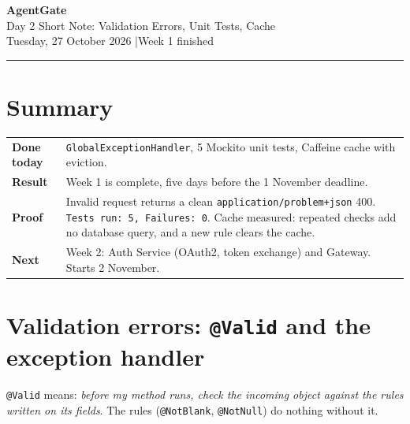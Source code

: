 \documentclass[11pt,a4paper]{article}
\newcommand{\code}[1]{\texttt{\small #1}}
\begin{document}
\begin{center}
  {\Huge\bfseries\color{accent} AgentGate}\\[0.4em]
  {\Large Day 2 Short Note: Validation Errors, Unit Tests, Cache}\\[0.5em]
  {\normalsize Tuesday, 27 October 2026 \quad|\quad Week 1 finished}
\end{center}
\vspace{0.2em}
\hrule
\vspace{0.6em}

\section*{Summary}

\begin{tabular}{@{}p{3.4cm}p{12.4cm}@{}}
\toprule
\textbf{Done today} & \code{GlobalExceptionHandler}, 5 Mockito unit tests, Caffeine cache with eviction. \\
\textbf{Result} & Week 1 is complete, five days before the 1 November deadline. \\
\textbf{Proof} & Invalid request returns a clean \code{application/problem+json} 400. \code{Tests run: 5, Failures: 0}. Cache measured: repeated checks add no database query, and a new rule clears the cache. \\
\textbf{Next} & Week 2: Auth Service (OAuth2, token exchange) and Gateway. Starts 2 November. \\
\bottomrule
\end{tabular}

\section{Validation errors: \texttt{@Valid} and the exception handler}

\code{@Valid} means: \emph{before my method runs, check the incoming object against the
rules written on its fields}. The rules (\code{@NotBlank}, \code{@NotNull}) do nothing
without it.
\end{document}
